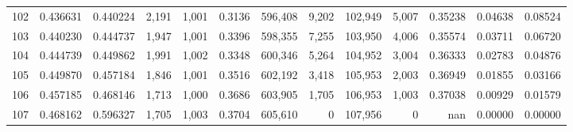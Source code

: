 \begin{tabular}{rrrrrrrrrrrrr}
102 &  0.436631 &  0.440224 &   2,191 &  1,001 &                                     0.3136 &  596,408 &    9,202 &  102,949 &    5,007 &  0.35238 &  0.04638 &  0.08524 \\
103 &  0.440230 &  0.444737 &   1,947 &  1,001 &                                     0.3396 &  598,355 &    7,255 &  103,950 &    4,006 &  0.35574 &  0.03711 &  0.06720 \\
104 &  0.444739 &  0.449862 &   1,991 &  1,002 &                                     0.3348 &  600,346 &    5,264 &  104,952 &    3,004 &  0.36333 &  0.02783 &  0.04876 \\
105 &  0.449870 &  0.457184 &   1,846 &  1,001 &                                     0.3516 &  602,192 &    3,418 &  105,953 &    2,003 &  0.36949 &  0.01855 &  0.03166 \\
106 &  0.457185 &  0.468146 &   1,713 &  1,000 &                                     0.3686 &  603,905 &    1,705 &  106,953 &    1,003 &  0.37038 &  0.00929 &  0.01579 \\
107 &  0.468162 &  0.596327 &   1,705 &  1,003 &                                     0.3704 &  605,610 &        0 &  107,956 &        0 &      nan &  0.00000 &  0.00000 \\
\bottomrule
\end{tabular}
